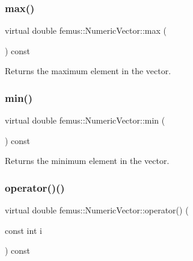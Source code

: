 \subsubsection{\texorpdfstring{max()}{max()}}
{\footnotesize\ttfamily virtual double femus\+::\+Numeric\+Vector\+::max (\begin{DoxyParamCaption}{ }\end{DoxyParamCaption}) const\hspace{0.3cm}{\ttfamily [pure virtual]}}

\begin{DoxyReturn}{Returns}
the maximum element in the vector. 
\end{DoxyReturn}
\mbox{\label{classfemus_1_1_numeric_vector_a243fa2b85e0ef03df5b6ce7096cd4700}} 
\subsubsection{\texorpdfstring{min()}{min()}}
{\footnotesize\ttfamily virtual double femus\+::\+Numeric\+Vector\+::min (\begin{DoxyParamCaption}{ }\end{DoxyParamCaption}) const\hspace{0.3cm}{\ttfamily [pure virtual]}}

\begin{DoxyReturn}{Returns}
the minimum element in the vector. 
\end{DoxyReturn}
\mbox{\label{classfemus_1_1_numeric_vector_ab54106edd2a7508e3b926d7e29772c20}} 
\subsubsection{\texorpdfstring{operator()()}{operator()()}}
{\footnotesize\ttfamily virtual double femus\+::\+Numeric\+Vector\+::operator() (\begin{DoxyParamCaption}\item[{const int}]{i }\end{DoxyParamCaption}) const\hspace{0.3cm}{\ttfamily [pure virtual]}}



